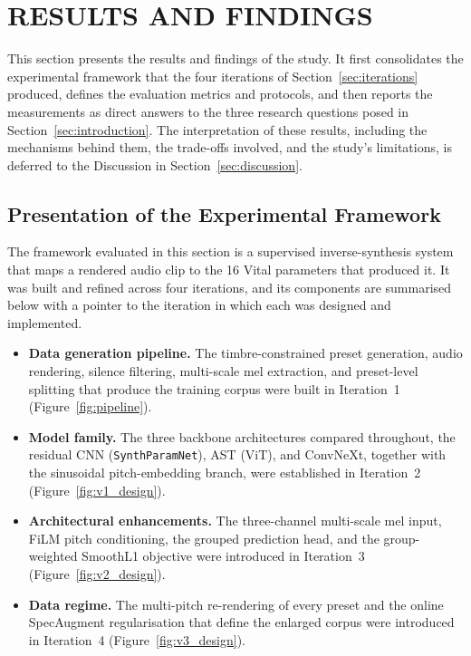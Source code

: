 
\section{RESULTS AND FINDINGS}
\label{sec:results}

\noindent
This section presents the results and findings of the study. It first consolidates the experimental framework that the four iterations of Section~\ref{sec:iterations} produced, defines the evaluation metrics and protocols, and then reports the measurements as direct answers to the three research questions posed in Section~\ref{sec:introduction}. The interpretation of these results, including the mechanisms behind them, the trade-offs involved, and the study's limitations, is deferred to the Discussion in Section~\ref{sec:discussion}.

\subsection{Presentation of the Experimental Framework}
\label{subsec:framework}

\noindent
The framework evaluated in this section is a supervised inverse-synthesis system that maps a rendered audio clip to the 16 Vital parameters that produced it. It was built and refined across four iterations, and its components are summarised below with a pointer to the iteration in which each was designed and implemented.

\begin{itemize}
    \item[$\blacksquare$] \textbf{Data generation pipeline.} The timbre-constrained preset generation, audio rendering, silence filtering, multi-scale mel extraction, and preset-level splitting that produce the training corpus were built in Iteration~1 (Figure~\ref{fig:pipeline}).
    \item[$\blacksquare$] \textbf{Model family.} The three backbone architectures compared throughout, the residual CNN (\texttt{SynthParamNet}), AST (ViT), and ConvNeXt, together with the sinusoidal pitch-embedding branch, were established in Iteration~2 (Figure~\ref{fig:v1_design}).
    \item[$\blacksquare$] \textbf{Architectural enhancements.} The three-channel multi-scale mel input, FiLM pitch conditioning, the grouped prediction head, and the group-weighted SmoothL1 objective were introduced in Iteration~3 (Figure~\ref{fig:v2_design}).
    \item[$\blacksquare$] \textbf{Data regime.} The multi-pitch re-rendering of every preset and the online SpecAugment regularisation that define the enlarged corpus were introduced in Iteration~4 (Figure~\ref{fig:v3_design}).
\end{itemize}

